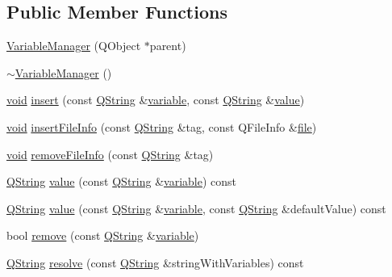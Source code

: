 \subsection*{Public Member Functions}
\begin{DoxyCompactItemize}
\item 
\hyperlink{group___core_plugin_ga15d91d2d564a2725a182ed7db3291322}{Variable\-Manager} (Q\-Object $\ast$parent)
\item 
\hyperlink{group___core_plugin_gab026fb876b54cb8afb586a6b2722f903}{$\sim$\-Variable\-Manager} ()
\item 
\hyperlink{group___u_a_v_objects_plugin_ga444cf2ff3f0ecbe028adce838d373f5c}{void} \hyperlink{group___core_plugin_ga2965065fe2031c5056f2d0f0b3528aea}{insert} (const \hyperlink{group___u_a_v_objects_plugin_gab9d252f49c333c94a72f97ce3105a32d}{Q\-String} \&\hyperlink{glext_8h_aac5473f0a0d0d38841ea8d37c5ca032d}{variable}, const \hyperlink{group___u_a_v_objects_plugin_gab9d252f49c333c94a72f97ce3105a32d}{Q\-String} \&\hyperlink{glext_8h_aa0e2e9cea7f208d28acda0480144beb0}{value})
\item 
\hyperlink{group___u_a_v_objects_plugin_ga444cf2ff3f0ecbe028adce838d373f5c}{void} \hyperlink{group___core_plugin_ga4cb680b84efeae7adb69d85e107971d8}{insert\-File\-Info} (const \hyperlink{group___u_a_v_objects_plugin_gab9d252f49c333c94a72f97ce3105a32d}{Q\-String} \&tag, const Q\-File\-Info \&\hyperlink{uavobjecttemplate_8m_a97c04efa65bcf0928abf9260bc5cbf46}{file})
\item 
\hyperlink{group___u_a_v_objects_plugin_ga444cf2ff3f0ecbe028adce838d373f5c}{void} \hyperlink{group___core_plugin_gaddc7379678c0d650267ea2946d5f6d3c}{remove\-File\-Info} (const \hyperlink{group___u_a_v_objects_plugin_gab9d252f49c333c94a72f97ce3105a32d}{Q\-String} \&tag)
\item 
\hyperlink{group___u_a_v_objects_plugin_gab9d252f49c333c94a72f97ce3105a32d}{Q\-String} \hyperlink{group___core_plugin_ga587c5ac6a8da8fb4ef815b60fbf2b48f}{value} (const \hyperlink{group___u_a_v_objects_plugin_gab9d252f49c333c94a72f97ce3105a32d}{Q\-String} \&\hyperlink{glext_8h_aac5473f0a0d0d38841ea8d37c5ca032d}{variable}) const 
\item 
\hyperlink{group___u_a_v_objects_plugin_gab9d252f49c333c94a72f97ce3105a32d}{Q\-String} \hyperlink{group___core_plugin_ga00675704f052101b23ad697bd13935ea}{value} (const \hyperlink{group___u_a_v_objects_plugin_gab9d252f49c333c94a72f97ce3105a32d}{Q\-String} \&\hyperlink{glext_8h_aac5473f0a0d0d38841ea8d37c5ca032d}{variable}, const \hyperlink{group___u_a_v_objects_plugin_gab9d252f49c333c94a72f97ce3105a32d}{Q\-String} \&default\-Value) const 
\item 
bool \hyperlink{group___core_plugin_gae2a894223982b2023accbac9cbe8d692}{remove} (const \hyperlink{group___u_a_v_objects_plugin_gab9d252f49c333c94a72f97ce3105a32d}{Q\-String} \&\hyperlink{glext_8h_aac5473f0a0d0d38841ea8d37c5ca032d}{variable})
\item 
\hyperlink{group___u_a_v_objects_plugin_gab9d252f49c333c94a72f97ce3105a32d}{Q\-String} \hyperlink{group___core_plugin_ga8b0765d1c6a498f76463b945923c5f6e}{resolve} (const \hyperlink{group___u_a_v_objects_plugin_gab9d252f49c333c94a72f97ce3105a32d}{Q\-String} \&string\-With\-Variables) const 
\end{DoxyCompactItemize}
